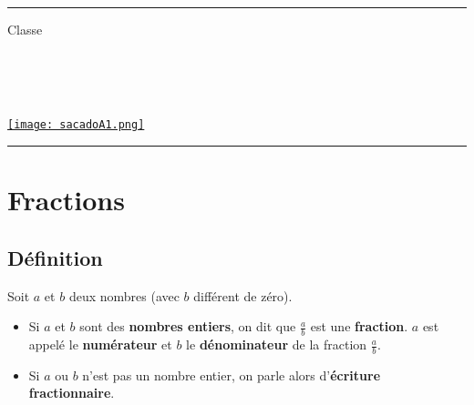 \documentclass[a4paper,dvipsnames]{article}
\begin{document}

\fancyhead[C]{}
\hrule\medskip %
\begin{minipage}{0.295\textwidth} 
\raggedright
Classe \myClasse \hfill\\
\myDiscipline \hfill\\
\myParcours \hfill\\
\end{minipage}
\begin{minipage}{0.4\textwidth} 
\centering 
\scshape\huge
\textcolor{sacado_purple}{\myTitle} \\ 
\normalsize 
\end{minipage}
\begin{minipage}{0.295\textwidth} 
\raggedleft
\href{https://sacado.xyz/}{\texttt{[image: sacadoA1.png]}}
\end{minipage}
\medskip \hrule
\bigskip


%

\section{Fractions}

\subsection{Définition}

\begin{Def}
Soit $a$ et $b$ deux nombres (avec $b$ différent de zéro).
\begin{itemize}
\item Si $a$ et $b$ sont des \textbf{nombres entiers}, on dit que $\frac{a}{b}$ est une \textbf{fraction}.
$a$ est appelé le \textbf{numérateur} et $b$ le \textbf{dénominateur} de la fraction $\frac{a}{b}$.
\item Si $a$ ou $b$ n'est pas un nombre entier, on parle alors d'\textbf{écriture fractionnaire}.
\end{itemize}
\end{Def}
\end{document}
